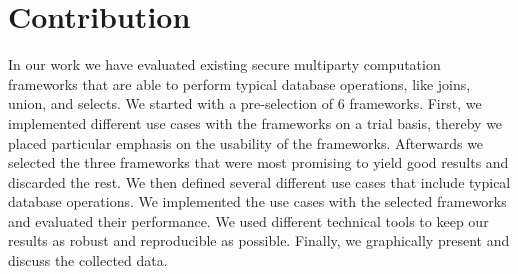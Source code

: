 \section{Contribution}
In our work we have evaluated existing secure multiparty computation frameworks that are able to perform typical database operations, like joins, union, and selects. We started with a pre-selection of 6 frameworks. First, we implemented different use cases with the frameworks on a trial basis, thereby we placed particular emphasis on the usability of the frameworks. Afterwards we selected the three frameworks that were most promising to yield good results and discarded the rest. We then defined several different use cases that include typical database operations. We implemented the use cases with the selected frameworks and evaluated their performance. We used different technical tools to keep our results as robust and reproducible as possible. Finally, we graphically present and discuss the collected data. 

